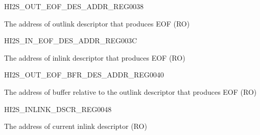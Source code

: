 \begin{register}{H}{I2S\_OUT\_EOF\_DES\_ADDR\_REG}{\hexprefix{}0038}\label{regdesc:I2SOUTEOFDESADDRREG}
%
\regnewline%
\begin{regdesc}\begin{reglist}
\label{fielddesc:I2SOUTEOFDESADDR}\item [I2S\_OUT\_EOF\_DES\_ADDR] The address of outlink descriptor that produces EOF (RO)
\end{reglist}\end{regdesc}
\end{register}


\begin{register}{H}{I2S\_IN\_EOF\_DES\_ADDR\_REG}{\hexprefix{}003C}\label{regdesc:I2SINEOFDESADDRREG}
%
\regnewline%
\begin{regdesc}\begin{reglist}
\label{fielddesc:I2SINSUCEOFDESADDR}\item [I2S\_IN\_SUC\_EOF\_DES\_ADDR] The address of inlink descriptor that produces EOF (RO)
\end{reglist}\end{regdesc}
\end{register}


\begin{register}{H}{I2S\_OUT\_EOF\_BFR\_DES\_ADDR\_REG}{\hexprefix{}0040}\label{regdesc:I2SOUTEOFBFRDESADDRREG}
%
\regnewline%
\begin{regdesc}\begin{reglist}
\label{fielddesc:I2SOUTEOFBFRDESADDR}\item [I2S\_OUT\_EOF\_BFR\_DES\_ADDR] The address of buffer relative to the outlink descriptor that produces EOF (RO)
\end{reglist}\end{regdesc}
\end{register}


\begin{register}{H}{I2S\_INLINK\_DSCR\_REG}{\hexprefix{}0048}\label{regdesc:I2SINLINKDSCRREG}
%
\regnewline%
\begin{regdesc}\begin{reglist}
\label{fielddesc:I2SINLINKDSCR}\item [I2S\_INLINK\_DSCR] The address of current inlink descriptor (RO)
\end{reglist}\end{regdesc}
\end{register}


